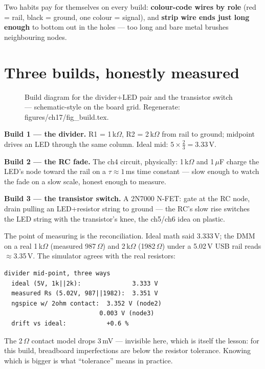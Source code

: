 \begin{checkpoint}
Two habits pay for themselves on every build: \textbf{colour-code
wires by role} (red = rail, black = ground, one colour = signal), and
\textbf{strip wire ends just long enough} to bottom out in the holes
--- too long and bare metal brushes neighbouring nodes.
\end{checkpoint}

\section{Three builds, honestly measured}\label{sec:builds17}

\begin{figure}[htbp]
\centering

\caption{Build diagram for the divider+LED pair and the transistor
switch --- schematic-style on the board grid. Regenerate: \ttfamily
figures/ch17/fig\_build.tex.}
\label{fig:build17}
\end{figure}

\textbf{Build 1 --- the divider.} R1 = 1\,k$\Omega$, R2 =
2\,k$\Omega$ from rail to ground; midpoint drives an LED through the
same column. Ideal mid: $5\times\frac{2}{3}=3.33$\,V.

\textbf{Build 2 --- the RC fade.} The ch4 circuit, physically:
1\,k$\Omega$ and 1\,$\mu$F charge the LED's node toward the rail on
a $\tau\approx1$\,ms time constant --- slow enough to watch the fade
on a slow scale, honest enough to measure.

\textbf{Build 3 --- the transistor switch.} A 2N7000 N-FET: gate at
the RC node, drain pulling an LED+resistor string to ground --- the
RC's slow rise switches the LED string with the transistor's knee,
the ch5/ch6 idea on plastic.

\begin{example}
The point of measuring is the reconciliation. Ideal math said
3.333\,V; the DMM on a real 1\,k$\Omega$ (measured 987\,$\Omega$)
and 2\,k$\Omega$ (1982\,$\Omega$) under a 5.02\,V USB rail reads
$\approx$3.35\,V. The simulator agrees with the real resistors:

\begin{lstlisting}[caption={\ttfamily ch17\_compare.py output ---
ideal vs measured-resistor sim vs real.}]
divider mid-point, three ways
  ideal (5V, 1k||2k):              3.333 V
  measured Rs (5.02V, 987||1982):  3.351 V
  ngspice w/ 2ohm contact:  3.352 V (node2)
                          0.003 V (node3)
  drift vs ideal:           +0.6 %
\end{lstlisting}

The 2\,$\Omega$ contact model drops 3\,mV --- invisible here, which
is itself the lesson: for this build, breadboard imperfections are
below the resistor tolerance. Knowing which is bigger is what
``tolerance'' means in practice.
\end{example}

